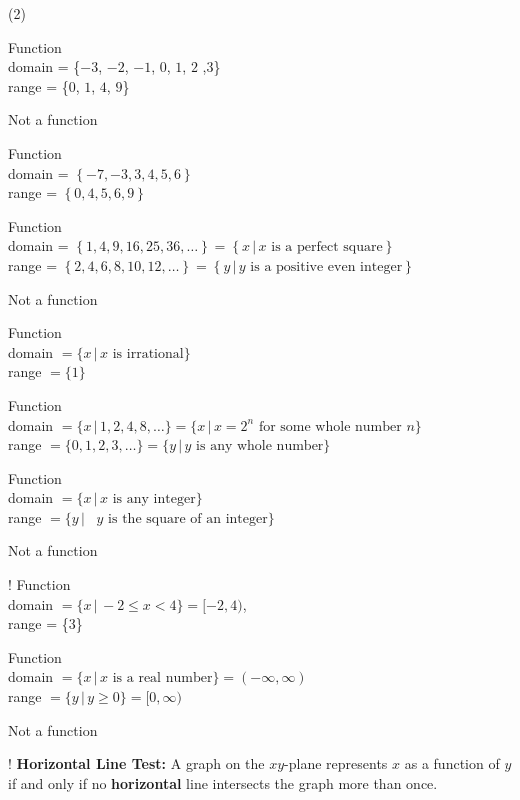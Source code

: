 \begin{tasks}[resume](2)

\task* Function \\ domain = \{$-3$, $-2$, $-1$, $0$, $1$, $2$ ,$3$\} \\ range = \{$0$, $1$, $4$, $9$\}

\task Not a function

\task*  Function \\ domain = $\left\{ -7, -3, 3, 4, 5, 6 \right\}$ \\ range = $\left\{ 0,4,5,6,9 \right\}$

\task*  Function \\ domain =   $\left\{ 1, 4, 9, 16, 25, 36, \ldots \right\} = \left\{ x \, | \, \text{$x$ is a perfect square} \right\}$ \\ range =  $\left\{ 2, 4, 6, 8, 10, 12, \ldots \right\} = \left\{ y \, | \, \text{$y$ is a positive even integer} \right\}$

\task  Not a function

\task* Function \\ domain $= \{x \, | \, \text{$x$ is irrational} \}$ \\ range $= \{ 1\}$

\task* Function \\ domain  $= \{x \, | \, 1, 2, 4, 8, \ldots \} = \{x \, | \, \text{$x = 2^{n}$ for some whole number $n$} \}$ \\ range $= \{ 0, 1, 2, 3, \ldots \} = \{y \, | \, \text{$y$ is any whole number}\}$

\task* Function \\ domain $= \{x \, | \, \text{$x$ is any integer} \}$ \\ range $= \{y \, | \, \text{ $y$ is the square of an integer}\}$

\task Not a function

\task! Function \\ domain  $= \{x \, | \, -2 \leq x < 4 \} = [-2, 4)$, \\ range = \{$3$\}

\task* Function \\ domain $= \{x \, | \,  \text{$x$ is a real number} \} = (-\infty, \infty)$ \\  range $= \{y \, | \,  y \geq 0 \} = [0,\infty)$

\task  Not a function

 \task! \textbf{Horizontal Line Test:} A graph on the $xy$-plane represents $x$ as a function of $y$ if and only if no \textbf{horizontal} line intersects the graph more than once.
 

\end{tasks}
